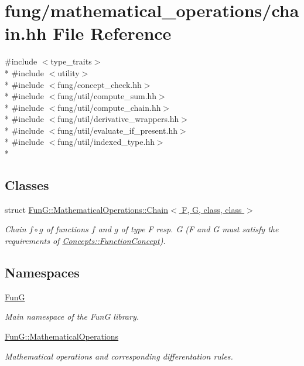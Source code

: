 \hypertarget{chain_8hh}{}\section{fung/mathematical\+\_\+operations/chain.hh File Reference}
\label{chain_8hh}
{\ttfamily \#include $<$type\+\_\+traits$>$}\\*
{\ttfamily \#include $<$utility$>$}\\*
{\ttfamily \#include $<$fung/concept\+\_\+check.\+hh$>$}\\*
{\ttfamily \#include $<$fung/util/compute\+\_\+sum.\+hh$>$}\\*
{\ttfamily \#include $<$fung/util/compute\+\_\+chain.\+hh$>$}\\*
{\ttfamily \#include $<$fung/util/derivative\+\_\+wrappers.\+hh$>$}\\*
{\ttfamily \#include $<$fung/util/evaluate\+\_\+if\+\_\+present.\+hh$>$}\\*
{\ttfamily \#include $<$fung/util/indexed\+\_\+type.\+hh$>$}\\*
\subsection*{Classes}
\begin{DoxyCompactItemize}
\item 
struct \hyperlink{structFunG_1_1MathematicalOperations_1_1Chain}{Fun\+G\+::\+Mathematical\+Operations\+::\+Chain$<$ F, G, class, class $>$}
\begin{DoxyCompactList}\small\item\em Chain $ f\circ g $ of functions $f$ and $g$ of type F resp. G (F and G must satisfy the requirements of \hyperlink{structFunG_1_1Concepts_1_1FunctionConcept}{Concepts\+::\+Function\+Concept}). \end{DoxyCompactList}\end{DoxyCompactItemize}
\subsection*{Namespaces}
\begin{DoxyCompactItemize}
\item 
 \hyperlink{namespaceFunG}{FunG}
\begin{DoxyCompactList}\small\item\em Main namespace of the FunG library. \end{DoxyCompactList}\item 
 \hyperlink{namespaceFunG_1_1MathematicalOperations}{Fun\+G\+::\+Mathematical\+Operations}
\begin{DoxyCompactList}\small\item\em Mathematical operations and corresponding differentation rules. \end{DoxyCompactList}\end{DoxyCompactItemize}
